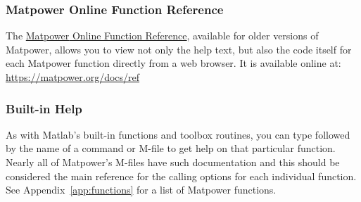 \documentclass[12pt]{article}
\newcommand{\matlab}[0]{{\sc Matlab}}
\newcommand{\matpower}[0]{{\sc Matpower}}
\newcommand{\code}[1]{{\relsize{-0.5}{\tt{{#1}}}}}  %
\numberwithin{equation}{section}
\numberwithin{table}{section}
\numberwithin{figure}{section}
\begin{document}
\subsubsection{\matpower{} Online Function Reference}

The \href{https://matpower.org/docs/ref}{\matpower{} Online Function Reference}, available for older versions of \matpower{}, allows you to view not only the help text, but also the code itself for each \matpower{} function directly from a web browser. It is available online at: \url{https://matpower.org/docs/ref}

\subsubsection{Built-in Help}

As with \matlab{}'s built-in functions and toolbox routines, you can type \code{help} followed by the name of a command or M-file to get help on that particular function. Nearly all of \matpower{}'s M-files have such documentation and this should be considered the main reference for the calling options for each individual function. See Appendix~\ref{app:functions} for a list of \matpower{} functions.
\end{document}
